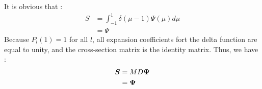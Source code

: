 It is obvious that :
\begin{equation}
\begin{split}
S &= \int_{-1}^1 \delta(\mu-1) \Psi(\mu) d\mu\\
&= \Psi
\end{split}
\end{equation}
Because $P_l(1)=1$ for all $l$, all expansion coefficients fort the delta
function are equal to unity, and the cross-section matrix is the identity
matrix. Thus, we have :
\begin{equation}
\begin{split}
\boldsymbol{S} &= MD\boldsymbol{\Psi}\\
&= \boldsymbol{\Psi}\\
\end{split}
\end{equation}

